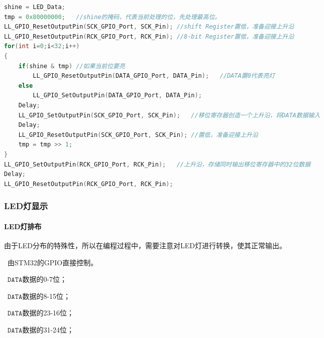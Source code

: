 \documentclass{article}
\begin{document}
\begin{multicols}{2}
\begin{lstlisting}[language=c]
shine = LED_Data;
tmp = 0x80000000;   //shine的掩码，代表当前处理的位，先处理最高位。
LL_GPIO_ResetOutputPin(SCK_GPIO_Port, SCK_Pin); //shift Register置低，准备迎接上升沿
LL_GPIO_ResetOutputPin(RCK_GPIO_Port, RCK_Pin); //8-bit Register置低，准备迎接上升沿
for(int i=0;i<32;i++)
{
    if(shine & tmp) //如果当前位要亮
        LL_GPIO_ResetOutputPin(DATA_GPIO_Port, DATA_Pin);   //DATA置0代表亮灯
    else
        LL_GPIO_SetOutputPin(DATA_GPIO_Port, DATA_Pin);
    Delay;
    LL_GPIO_SetOutputPin(SCK_GPIO_Port, SCK_Pin);   //移位寄存器创造一个上升沿，将DATA数据输入
    Delay;
    LL_GPIO_ResetOutputPin(SCK_GPIO_Port, SCK_Pin); //置低，准备迎接上升沿
    tmp = tmp >> 1;
}
LL_GPIO_SetOutputPin(RCK_GPIO_Port, RCK_Pin);   //上升沿，存储同时输出移位寄存器中的32位数据
Delay;
LL_GPIO_ResetOutputPin(RCK_GPIO_Port, RCK_Pin);
\end{lstlisting}
\end{multicols}
\subsubsection{LED灯显示}
\paragraph{LED灯排布}由于LED分布的特殊性，所以在编程过程中，需要注意对LED灯进行转换，使其正常输出。
\begin{multicols}{2}
\ 由STM32的GPIO直接控制。\par
{}\ $\texttt{DATA}$数据的0-7位；\par
{}\ $\texttt{DATA}$数据的8-15位；\par
{}\ $\texttt{DATA}$数据的23-16位；\par
{}\ $\texttt{DATA}$数据的31-24位；\par
\end{multicols}
\end{document}
